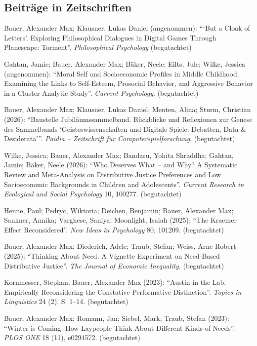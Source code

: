 \documentclass[a4paper,10pt]{article}
\newenvironment{literature}{%
   \parskip6pt\parindent0pt\raggedright
   \def\lititem{\hangindent=1cm\hangafter1}}{%
   \par\ignorespaces}
\begin{document}
\subsection*{Beiträge in Zeitschriften}
\begin{literature}
\lititem Bauer, Alexander Max; Klausner, Lukas Daniel (angenommen): \enquote{\enquote{But a Cloak of Letters}. Exploring Philosophical Dialogues in Digital Games Through Planescape: Torment}. \textit{Philosophical Psychology} (begutachtet)

\lititem Gahtan, Jamie; Bauer, Alexander Max; Bäker, Neele; Eilts, Jule; Wilke, Jessica (angenommen): \enquote{Moral Self and Socioeconomic Profiles in Middle Childhood. Examining the Links to Self-Esteem, Prosocial Behavior, and Aggressive Behavior in a Cluster-Analytic Study}. \textit{Current Psychology}. (begutachtet)

\lititem Bauer, Alexander Max; Klausner, Lukas Daniel; Menten, Alina; Sturm, Christian (2026): \enquote{Baustelle Jubiläumssammelband. Rückblicke und Reflexionen zur Genese des Sammelbands \enquote{Geisteswissenschaften und Digitale Spiele: Debatten, Data \& Desiderata}}. \textit{Paidia -- Zeitschrift für Computerspielforschung}. (begutachtet)

\lititem Wilke, Jessica; Bauer, Alexander Max; Bandaru, Yohita Shraddha; Gahtan, Jamie; Bäker, Neele (2026): \enquote{Who Deserves What -- and Why? A Systematic Review and Meta-Analysis on Distributive Justice Preferences and Low Socioeconomic Backgrounds in Children and Adolescents}. \textit{Current Research in Ecological and Social Psychology} 10, 100277. (begutachtet)

\lititem Henne, Paul; Pedryc, Wiktoria; Deichen, Benjamin; Bauer, Alexander Max; Sankner, Annika; Varghese, Saniya; Moonlight, Isaiah (2025): \enquote{The Kraemer Effect Reconsidered}. \textit{New Ideas in Psychology} 80, 101209. (begutachtet)

\lititem Bauer, Alexander Max; Diederich, Adele; Traub, Stefan; Weiss, Arne Robert (2025): \enquote{Thinking About Need. A Vignette Experiment on Need-Based Distributive Justice}. \textit{The Journal of Economic Inequality}. (begutachtet)

\lititem Kornmesser, Stephan; Bauer, Alexander Max (2023): \enquote{Austin in the Lab. Empirically Reconsidering the Constative-Performative Distinction}. \textit{Topics in Linguistics} 24 (2), S. 1--14. (begutachtet)

\lititem Bauer, Alexander Max; Romann, Jan; Siebel, Mark; Traub, Stefan (2023): \enquote{Winter is Coming. How Laypeople Think About Different Kinds of Needs}. \textit{PLOS ONE} 18 (11), e0294572. (begutachtet)


\end{literature}
\end{document}
